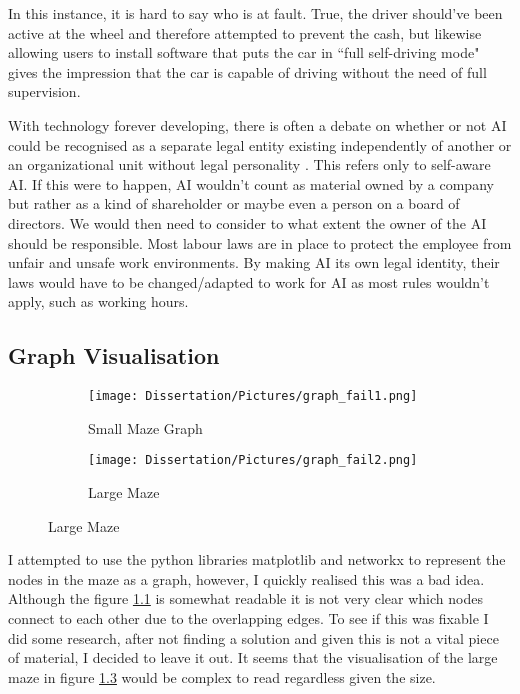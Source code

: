 \documentclass[]{final_report}
\begin{document}
In this instance, it is hard to say who is at fault. True, the driver should've been active at the wheel and therefore attempted to prevent the cash, but likewise allowing users to install software that puts the car in ``full self-driving mode" gives the impression that the car is capable of driving without the need of full supervision.

 With technology forever developing, there is often a debate on whether or not AI could be recognised as a separate legal entity existing independently of another or an organizational unit without legal personality \cite{nowik2021electronic}. This refers only to self-aware AI. If this were to happen, AI wouldn't count as material owned by a company but rather as a kind of shareholder or maybe even a person on a board of directors. We would then need to consider to what extent the owner of the AI should be responsible. Most labour laws are in place to protect the employee from unfair and unsafe work environments. By making AI its own legal identity, their laws would have to be changed/adapted to work for AI as most rules wouldn't apply, such as working hours.

\newpage
{}

\label{endpage}

\newpage

\begin{appendices}
\chapter{Graph Visualisation}\label{Graph visualisation}
\begin{figure}[h]
     \caption{Graph Representation of maze}
     \centering
     \begin{subfigure}[h]{1\textwidth}
         \centering
         \texttt{[image: Dissertation/Pictures/graph\_fail1.png]}
         \caption{Small Maze Graph}
         \label{fig: Small Maze graph}
     \end{subfigure}
     \hfill
     \begin{subfigure}[h]{1\textwidth}
         \centering
         \texttt{[image: Dissertation/Pictures/graph\_fail2.png]}
         \caption{Large Maze}
         \label{fig: Large Maze Graph}
     \end{subfigure}
\end{figure}

I attempted to use the python libraries matplotlib and networkx to represent the nodes in the maze as a graph, however, I quickly realised this was a bad idea. Although the figure \ref{fig: Small Maze graph} is somewhat readable it is not very clear which nodes connect to each other due to the overlapping edges. To see if this was fixable I did some research, after not finding a solution and given this is not a vital piece of material, I decided to leave it out. It seems that the visualisation of the large maze in figure \ref{fig: Large Maze Graph} would be complex to read regardless given the size.
\end{appendices}
\end{document}
